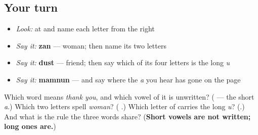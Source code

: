 \subsection*{Your turn}
\begin{itemize}
\raggedright
  \item \emph{Look:} at \textbf{} and name each letter from the right
  \item \emph{Say it:} \textbf{zan} — woman; then name its two letters
  \item \emph{Say it:} \textbf{dust} — friend; then say which of its four letters is the long \emph{u}
  \item \emph{Say it:} \textbf{mamnun} — and say where the \emph{a} you hear has gone on the page
\end{itemize}

\begin{tcolorbox}[breakable,colback=teal!4,colframe=teal!35!black,title={Before you move on}]
Which word means \emph{thank you}, and which vowel of it is unwritten? (\textbf{} — the short \emph{a}.) Which two letters spell \emph{woman}? (\textbf{ }.) Which letter of \textbf{} carries the long \emph{u}? (\textbf{}.) And what is the rule the three words share? (\textbf{Short vowels are not written; long ones are.})
\end{tcolorbox}
